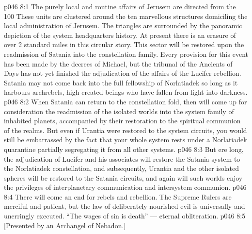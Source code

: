 \vs p046 8:1 The purely local and routine affairs of Jerusem are directed from the 100  These units are clustered around the ten marvellous structures domiciling the local administration of Jerusem. The triangles are surrounded by the panoramic depiction of the system headquarters history. At present there is an erasure of over 2 standard miles in this circular story. This sector will be restored upon the readmission of Satania into the constellation family. Every provision for this event has been made by the decrees of Michael, but the tribunal of the Ancients of Days has not yet finished the adjudication of the affairs of the Lucifer rebellion. Satania may not come back into the full fellowship of Norlatiadek so long as it harbours archrebels, high created beings who have fallen from light into darkness.
\vs p046 8:2 When Satania can return to the constellation fold, then will come up for consideration the readmission of the isolated worlds into the system family of inhabited planets, accompanied by their restoration to the spiritual communion of the realms. But even if Urantia were restored to the system circuits, you would still be embarrassed by the fact that your whole system rests under a Norlatiadek quarantine partially segregating it from all other systems.
\vs p046 8:3 \pc But ere long, the adjudication of Lucifer and his associates will restore the Satania system to the Norlatiadek constellation, and subsequently, Urantia and the other isolated spheres will be restored to the Satania circuits, and again will such worlds enjoy the privileges of interplanetary communication and intersystem communion.
\vs p046 8:4 \pc There will come an end for rebels and rebellion. The Supreme Rulers are merciful and patient, but the law of deliberately nourished evil is universally and unerringly executed. “The wages of sin is death” --- eternal obliteration.
\vsetoff
\vs p046 8:5 [Presented by an Archangel of Nebadon.]
\quizlink
